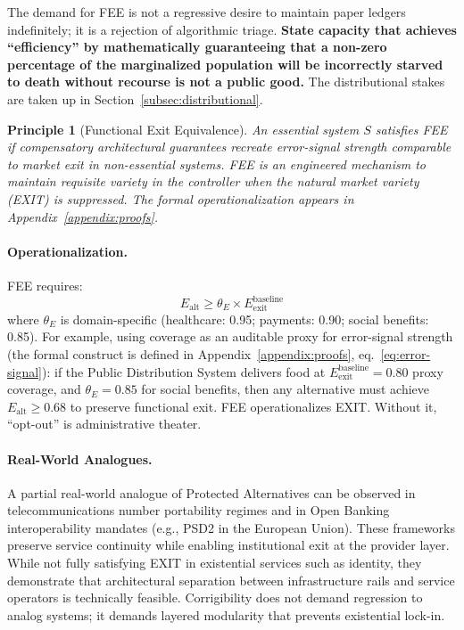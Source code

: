 \documentclass{article}
\newtheorem{principle}{Principle}[section]
\begin{document}
The demand for FEE is not a regressive desire to maintain paper ledgers indefinitely; it is a rejection of algorithmic triage. \textbf{State capacity that achieves ``efficiency'' by mathematically guaranteeing that a non-zero percentage of the marginalized population will be incorrectly starved to death without recourse is not a public good.} The distributional stakes are taken up in Section~\ref{subsec:distributional}.

\begin{principle}[Functional Exit Equivalence]
An essential system $S$ satisfies FEE if compensatory architectural guarantees recreate error-signal strength comparable to market exit in non-essential systems. FEE is an engineered mechanism to maintain requisite variety in the controller when the natural market variety (EXIT) is suppressed. The formal operationalization appears in Appendix~\ref{appendix:proofs}.
\end{principle}

\paragraph{Operationalization.} FEE requires:
\begin{equation}
E_{\text{alt}} \geq \theta_E \times E_{\text{exit}}^{\text{baseline}}
\end{equation}
where $\theta_E$ is domain-specific (healthcare: 0.95; payments: 0.90; social benefits: 0.85). For example, using coverage as an auditable proxy for error-signal strength (the formal construct is defined in Appendix~\ref{appendix:proofs}, eq.~\ref{eq:error-signal}): if the Public Distribution System delivers food at $E_{\text{exit}}^{\text{baseline}} = 0.80$ proxy coverage, and $\theta_E = 0.85$ for social benefits, then any alternative must achieve $E_{\text{alt}} \geq 0.68$ to preserve functional exit. FEE operationalizes EXIT. Without it, ``opt-out'' is administrative theater.

\paragraph{Real-World Analogues.} A partial real-world analogue of Protected Alternatives can be observed in telecommunications number portability regimes and in Open Banking interoperability mandates (e.g., PSD2 in the European Union). These frameworks preserve service continuity while enabling institutional exit at the provider layer. While not fully satisfying EXIT in existential services such as identity, they demonstrate that architectural separation between infrastructure rails and service operators is technically feasible. Corrigibility does not demand regression to analog systems; it demands layered modularity that prevents existential lock-in.
\end{document}
